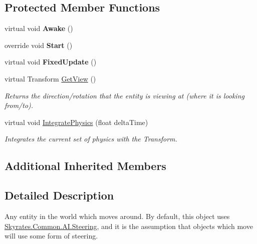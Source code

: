 \subsection*{Protected Member Functions}
\begin{DoxyCompactItemize}
\item 
\hypertarget{class_skyrates_1_1_common_1_1_entity_1_1_entity_dynamic_a2364ce439984919790139305d2d2f91b}{virtual void {\bfseries Awake} ()}\label{class_skyrates_1_1_common_1_1_entity_1_1_entity_dynamic_a2364ce439984919790139305d2d2f91b}

\item 
\hypertarget{class_skyrates_1_1_common_1_1_entity_1_1_entity_dynamic_a0e3f4c361734de124f27ed7d331bd12c}{override void {\bfseries Start} ()}\label{class_skyrates_1_1_common_1_1_entity_1_1_entity_dynamic_a0e3f4c361734de124f27ed7d331bd12c}

\item 
\hypertarget{class_skyrates_1_1_common_1_1_entity_1_1_entity_dynamic_adc9f4729654d4c86a404c0ccd966ccd3}{virtual void {\bfseries Fixed\-Update} ()}\label{class_skyrates_1_1_common_1_1_entity_1_1_entity_dynamic_adc9f4729654d4c86a404c0ccd966ccd3}

\item 
virtual Transform \hyperlink{class_skyrates_1_1_common_1_1_entity_1_1_entity_dynamic_a7d214d221e4933f54528a707da1cc129}{Get\-View} ()
\begin{DoxyCompactList}\small\item\em Returns the direction/rotation that the entity is viewing at (where it is looking from/to). \end{DoxyCompactList}\item 
virtual void \hyperlink{class_skyrates_1_1_common_1_1_entity_1_1_entity_dynamic_a994dbf8d2f10ff4398dbf2f68049205a}{Integrate\-Physics} (float delta\-Time)
\begin{DoxyCompactList}\small\item\em Integrates the current set of physics with the Transform. \end{DoxyCompactList}\end{DoxyCompactItemize}
\subsection*{Additional Inherited Members}


\subsection{Detailed Description}
Any entity in the world which moves around. By default, this object uses \hyperlink{class_skyrates_1_1_common_1_1_a_i_1_1_steering}{Skyrates.\-Common.\-A\-I.\-Steering}, and it is the assumption that objects which move will use some form of steering. 




